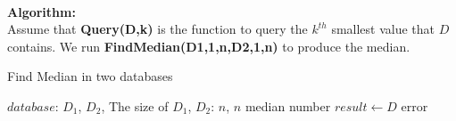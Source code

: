 \documentclass[11pt]{article}
\begin{document}
\begin{CJK*}{UTF8}{gkai}
    \paragraph{}\textbf{Algorithm:}\\
    Assume that \textbf{Query(D,k)} is the function to query the $k^{th}$ smallest value that $D$ contains. We run \textbf{FindMedian(D1,1,n,D2,1,n)} to produce the median.
    \begin{algorithm}
        \caption{Find Median in two databases} %
        \begin{algorithmic}[1] %
            \Require $database$: $D_1$, $D_2$, \qquad The size of $D_1$, $D_2$: $n$, $n$
            \Ensure median number
                \State $result \gets D$
                    \State error
                \EndIf
                \State {}
            \EndFunction
            \State


\end{algorithmic}
\end{algorithm}
\end{CJK*}
\end{document}
